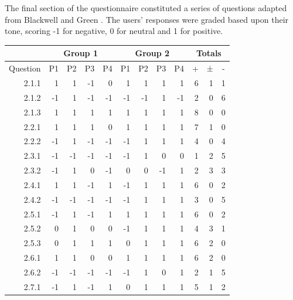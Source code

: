 \documentclass[12pt,twoside,notitlepage,xetex]{report}
\begin{document}
The final section of the questionnaire constituted a series of questions adapted from Blackwell and Green \cite{Blackwell2000}.  The users' responses were graded based upon their tone, scoring -1 for negative, 0 for neutral and 1 for positive.

\begin{center}
\begin{table}[H]
\begin{center}
\begin{tabular}{|r||r|r|r|r||r|r|r|r||r|r|r|}
\cline{2-12}
\multicolumn{1}{c}{} & \multicolumn{4}{|c|}{Group 1} & \multicolumn{4}{c||}{Group 2} & \multicolumn{3}{c|}{Totals}\\ \hline
\multicolumn{1}{|c||}{Question} & \multicolumn{1}{c|}{P1} & \multicolumn{1}{c|}{P2} & \multicolumn{1}{c|}{P3} & \multicolumn{1}{c||}{P4} & \multicolumn{1}{c|}{P1} & \multicolumn{1}{c|}{P2} & \multicolumn{1}{c|}{P3} & \multicolumn{1}{c||}{P4} & \multicolumn{1}{c|}{+} & \multicolumn{1}{c|}{±} & \multicolumn{1}{c|}{-}\\ \hline \hline
2.1.1 & 1 & 1 & -1 & 0 & 1 & 1 & 1 & 1 & 6 & 1 & 1\\ \hline
2.1.2 & -1 & 1 & -1 & -1 & -1 & -1 & 1 & -1 & 2 & 0 & 6\\ \hline
2.1.3 & 1 & 1 & 1 & 1 & 1 & 1 & 1 & 1 & 8 & 0 & 0\\ \hline
2.2.1 & 1 & 1 & 1 & 0 & 1 & 1 & 1 & 1 & 7 & 1 & 0\\ \hline
2.2.2 & -1 & 1 & -1 & -1 & -1 & 1 & 1 & 1 & 4 & 0 & 4\\ \hline
2.3.1 & -1 & -1 & -1 & -1 & -1 & 1 & 0 & 0 & 1 & 2 & 5\\ \hline
2.3.2 & -1 & 1 & 0 & -1 & 0 & 0 & -1 & 1 & 2 & 3 & 3\\ \hline
2.4.1 & 1 & 1 & -1 & 1 & -1 & 1 & 1 & 1 & 6 & 0 & 2\\ \hline
2.4.2 & -1 & -1 & -1 & -1 & -1 & 1 & 1 & 1 & 3 & 0 & 5\\ \hline
2.5.1 & -1 & 1 & -1 & 1 & 1 & 1 & 1 & 1 & 6 & 0 & 2\\ \hline
2.5.2 & 0 & 1 & 0 & 0 & -1 & 1 & 1 & 1 & 4 & 3 & 1\\ \hline
2.5.3 & 0 & 1 & 1 & 1 & 0 & 1 & 1 & 1 & 6 & 2 & 0\\ \hline
2.6.1 & 1 & 1 & 0 & 0 & 1 & 1 & 1 & 1 & 6 & 2 & 0\\ \hline
2.6.2 & -1 & -1 & -1 & -1 & -1 & 1 & 0 & 1 & 2 & 1 & 5\\ \hline
2.7.1 & -1 & 1 & -1 & 1 & 0 & 1 & 1 & 1 & 5 & 1 & 2\\ \hline

\end{tabular}
\end{center}
\end{table}
\end{center}
\end{document}

